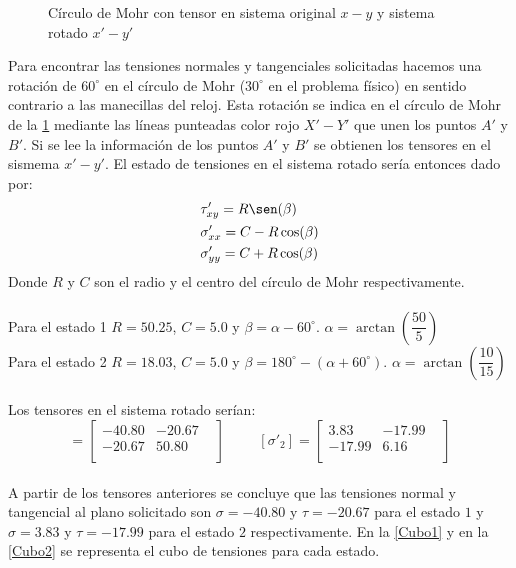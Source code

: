 \documentclass[../notas medios.tex]{subfiles}
\begin{document}
\begin{enumerate}
\begin{figure}[H]
	\caption{Círculo de Mohr con tensor en sistema original $x-y$ y sistema rotado
	$x'-y'$ }
	\label{Tensiones}
\end{figure}
%
Para encontrar las tensiones normales y tangenciales solicitadas hacemos una
rotación de $60^{\circ}$ en el círculo de Mohr ($30^{\circ}$ en el problema
físico) en sentido contrario a las manecillas del reloj. Esta rotación se indica
en el círculo de Mohr de la \cref{Tensiones} mediante las líneas punteadas
color rojo $X'-Y'$ que unen los puntos $A'$ y $B'$. Si se lee la información
de los puntos $A'$ y $B'$ se obtienen los tensores en el sismema $x'-y'$. El
estado de tensiones en el sistema rotado sería entonces dado por:
%
\begin {equation}
\begin {aligned}
 &\tau'_{xy} = R  \sen (\beta) \\
 &\sigma'_{xx} = C - R  \cos(\beta) \\
 &\sigma'_{yy} = C + R  \cos(\beta) \\
\end {aligned}
\label{cicmohr1}
\end {equation}
%
Donde $R$ y $C$ son el radio  y el centro del círculo de Mohr
respectivamente.\\\\
%
Para el estado 1 $R = 50.25$, $C = 5.0$ y $\beta =\alpha - 60 ^{\circ}$. $\alpha
= \arctan\left(\dfrac{50}{5}\right)$ \\
%
Para el estado 2 $R = 18.03 $, $C = 5.0$ y $\beta =180^{\circ} - (\alpha +
60^{\circ})$. $\alpha = \arctan\left(\dfrac{10}{15}\right)$ \\\\
%
Los tensores en el sistema rotado serían: \\
 \begin{equation*}
[\sigma'_1] =
 	\begin{bmatrix}
     	-40.80 & -20.67 & \\
     	-20.67 & 50.80 \\
 	\end{bmatrix}
 \hspace{1cm}
 [\sigma'_2] =
 	\begin{bmatrix}
     	3.83 & -17.99 & \\
     	-17.99 & 6.16 \\
 	\end{bmatrix}
\end{equation*} \\
A partir de los tensores anteriores se concluye que las tensiones normal y tangencial
al plano solicitado son $\sigma=-40.80$ y  $\tau = -20.67$ para el estado $1$ y
$\sigma=3.83$ y  $\tau = -17.99$ para el estado $2$ respectivamente. En la
\cref{Cubo1} y en la \cref{Cubo2} se representa el cubo de tensiones para cada estado.
%


\end{enumerate}
\end{document}

